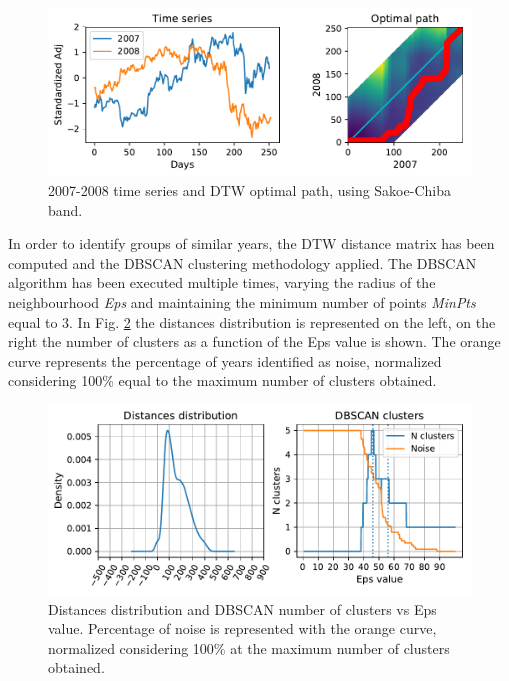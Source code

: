 \documentclass[a4paper,11pt,final]{article}
\begin{document}
\begin{figure}[htpb]
\center
\includegraphics[width= \textwidth]{figures/report_dtw_example_1.pdf}
\caption{ 2007-2008 time series and DTW optimal path, using Sakoe-Chiba band.}
\label{fig:dtw_example}
\end{figure}








In order to identify groups of similar years, the DTW distance matrix has been computed and the DBSCAN clustering methodology applied. 
The DBSCAN algorithm has been executed multiple times, varying the radius of the neighbourhood \textit{Eps} and maintaining the minimum number of points \textit{MinPts} equal to 3. In Fig. \ref{fig:dbscan_clustering} the distances distribution is represented on the left, on the right the number of clusters as a function of the Eps value is shown. The orange curve represents the percentage of years identified as noise, normalized considering 100\% equal to the maximum number of clusters obtained. 



\begin{figure}[htpb]
\center
\includegraphics[width= \linewidth]{figures/report_dbscan_clustering_1.pdf}
\caption{Distances distribution and DBSCAN number of clusters vs Eps value. Percentage of noise is represented with the orange curve,   normalized considering 100\% at the maximum number of clusters obtained.}
\label{fig:dbscan_clustering}
\end{figure}
\end{document}
